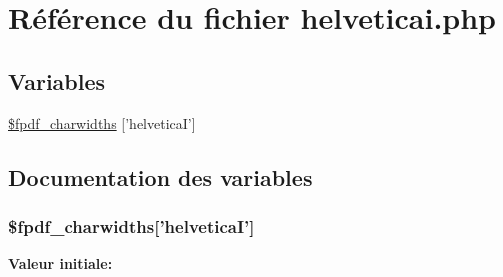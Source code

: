 \hypertarget{helveticai_8php}{
\section{R\'{e}f\'{e}rence du fichier helveticai.php}
\label{helveticai_8php}
}
\subsection*{Variables}
\begin{CompactItemize}
\item 
\hyperlink{helveticai_8php_a0}{\$fpdf\_\-charwidths} \mbox{[}'helvetica\-I'\mbox{]}
\end{CompactItemize}


\subsection{Documentation des variables}
\hypertarget{helveticai_8php_a0}{
\subsubsection[\$fpdf\_\-charwidths]{\setlength{\rightskip}{0pt plus 5cm}\$fpdf\_\-charwidths\mbox{[}'helvetica\-I'\mbox{]}}}
\label{helveticai_8php_a0}


{\bf Valeur initiale:}

